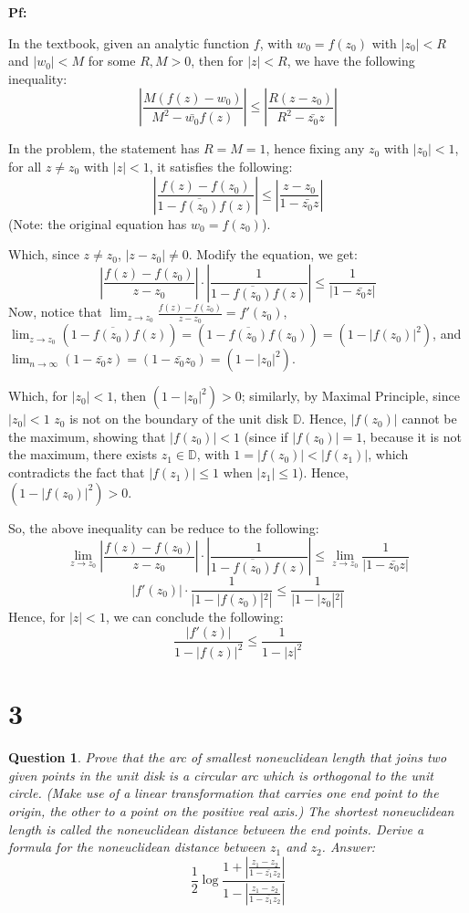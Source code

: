 \documentclass{article}
\newtheorem{question}{Question}
\begin{document}
\textbf{Pf:}

In the textbook, given an analytic function $f$, with $w_0=f(z_0)$ with $|z_0|<R$ and $|w_0|<M$ for some $R,M>0$,
then for $|z|<R$, we have the following inequality:
$$\left|\frac{M(f(z)-w_0)}{M^2-\bar{w_0}f(z)}\right|\leq \left|\frac{R(z-z_0)}{R^2-\bar{z_0}z}\right|$$

\hfill

In the problem, the statement has $R=M=1$, hence fixing any $z_0$ with $|z_0|<1$, for all $z\neq z_0$ with $|z|<1$, it satisfies the following:
$$\left|\frac{f(z)-f(z_0)}{1-\overline{f(z_0)}f(z)}\right|\leq \left|\frac{z-z_0}{1-\bar{z_0}z}\right|$$
(Note: the original equation has $w_0=f(z_0)$).

Which, since $z\neq z_0$, $|z-z_0|\neq 0$. Modify the equation, we get:
$$\left|\frac{f(z)-f(z_0)}{z-z_0}\right|\cdot\left|\frac{1}{1-\overline{f(z_0)}f(z)}\right|\leq \frac{1}{|1-\bar{z_0}z|}$$
Now, notice that $\lim_{z\rightarrow z_0}\frac{f(z)-f(z_0)}{z-z_0} = f'(z_0)$, $\lim_{z\rightarrow z_0} (1-\overline{f(z_0)}f(z)) = (1-\overline{f(z_0)}f(z_0)) = (1-|f(z_0)|^2)$, and $\lim_{n\rightarrow\infty}(1-\bar{z_0}z) = (1-\bar{z_0}z_0) = (1-|z_0|^2)$.

Which, for $|z_0|<1$, then $(1-|z_0|^2) > 0$; similarly, by Maximal Principle, since $|z_0|<1$ $z_0$ is not on the boundary of the unit disk $\mathbb{D}$.
Hence, $|f(z_0)|$ cannot be the maximum, showing that $|f(z_0)|<1$ (since if $|f(z_0)|=1$, because it is not the maximum, there exists $z_1\in \mathbb{D}$, with $1=|f(z_0)| <|f(z_1)|$, 
which contradicts the fact that $|f(z_1)|\leq 1$ when $|z_1|\leq 1$). Hence, $(1-|f(z_0)|^2) > 0$.

So, the above inequality can be reduce to the following:
$$\lim_{z\rightarrow z_0}\left|\frac{f(z)-f(z_0)}{z-z_0}\right|\cdot\left|\frac{1}{1-\overline{f(z_0)}f(z)}\right|\leq \lim_{z\rightarrow z_0}\frac{1}{|1-\bar{z_0}z|}$$
$$|f'(z_0)|\cdot \frac{1}{|1-|f(z_0)|^2|}\leq \frac{1}{|1-|z_0|^2|}$$
Hence, for $|z|<1$, we can conclude the following:
$$\frac{|f'(z)|}{1-|f(z)|^2}\leq \frac{1}{1-|z|^2}$$

\break

\section*{3}
\begin{myBox}[]{}
    \begin{question}
        Prove that the arc of smallest noneuclidean length that joins two
        given points in the unit disk is a circular arc which is orthogonal to the unit
        circle. (Make use of a linear transformation that carries one end point
        to the origin, the other to a point on the positive real axis.)
        The shortest noneuclidean length is called the noneuclidean distance
        between the end points. Derive a formula for the noneuclidean distance
        between $z_1$ and $z_2$. Answer:
        $$\frac{1}{2}\log\frac{1+\left|\frac{z_1-z_2}{1-\bar{z_1}z_2}\right|}{1-\left|\frac{z_1-z_2}{1-\bar{z_1}z_2}\right|}$$
    \end{question}
\end{myBox}
\end{document}
